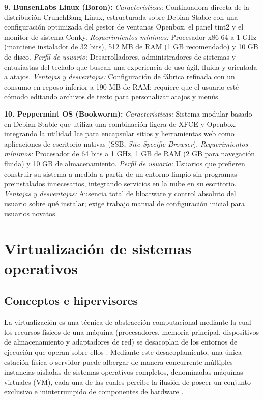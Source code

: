 \documentclass[12pt]{article}
\begin{document}
\smallskip
\noindent\textbf{9. BunsenLabs Linux (Boron):}
\textit{Características:} Continuadora directa de la distribución CrunchBang Linux, estructurada sobre Debian Stable con una configuración optimizada del gestor de ventanas Openbox, el panel tint2 y el monitor de sistema Conky.
\textit{Requerimientos mínimos:} Procesador x86-64 a 1 GHz (mantiene instalador de 32 bits), 512 MB de RAM (1 GB recomendado) y 10 GB de disco.
\textit{Perfil de usuario:} Desarrolladores, administradores de sistemas y entusiastas del teclado que buscan una experiencia de uso ágil, fluida y orientada a atajos.
\textit{Ventajas y desventajas:} Configuración de fábrica refinada con un consumo en reposo inferior a 190 MB de RAM; requiere que el usuario esté cómodo editando archivos de texto para personalizar atajos y menús.

\smallskip
\noindent\textbf{10. Peppermint OS (Bookworm):}
\textit{Características:} Sistema modular basado en Debian Stable que utiliza una combinación ligera de XFCE y Openbox, integrando la utilidad Ice para encapsular sitios y herramientas web como aplicaciones de escritorio nativas (SSB, \textit{Site-Specific Browser}).
\textit{Requerimientos mínimos:} Procesador de 64 bits a 1 GHz, 1 GB de RAM (2 GB para navegación fluida) y 10 GB de almacenamiento.
\textit{Perfil de usuario:} Usuarios que prefieren construir su sistema a medida a partir de un entorno limpio sin programas preinstalados innecesarios, integrando servicios en la nube en su escritorio.
\textit{Ventajas y desventajas:} Ausencia total de bloatware y control absoluto del usuario sobre qué instalar; exige trabajo manual de configuración inicial para usuarios novatos.

\section{Virtualización de sistemas operativos}\label{sec:virtualizacionSo}

\subsection{Conceptos e hipervisores}\label{sec:conceptosHipervisores}

La virtualización es una técnica de abstracción computacional mediante la cual los recursos físicos de una máquina (procesadores, memoria principal, dispositivos de almacenamiento y adaptadores de red) se desacoplan de los entornos de ejecución que operan sobre ellos \parencite[\S 14.1, p.\ 628]{stallings2018operating}. Mediante este desacoplamiento, una única estación física o servidor puede albergar de manera concurrente múltiples instancias aisladas de sistemas operativos completos, denominadas máquinas virtuales (VM), cada una de las cuales percibe la ilusión de poseer un conjunto exclusivo e ininterrumpido de componentes de hardware \parencite[\S 2.8, pp.\ 58--59]{silberschatz2006fundamentos}.
\end{document}
